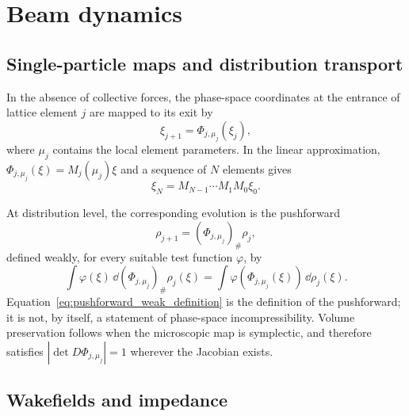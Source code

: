 \section{Beam dynamics}
\label{sec:beam_dynamics_data}

\subsection{Single-particle maps and distribution transport}

In the absence of collective forces, the phase-space coordinates at the entrance of lattice element $j$ are mapped to its exit by
\begin{equation}
    \xi_{j+1}=\Phi_{j,\mu_j}(\xi_j),
    \label{eq:single_particle_map}
\end{equation}
where $\mu_j$ contains the local element parameters. In the linear approximation, $\Phi_{j,\mu_j}(\xi)=M_j(\mu_j)\xi$ and a sequence of $N$ elements gives
\begin{equation}
    \xi_N=M_{N-1}\cdots M_1M_0\xi_0.
    \label{eq:linear_particle_transport}
\end{equation}

At distribution level, the corresponding evolution is the pushforward
\begin{equation}
    \rho_{j+1}=(\Phi_{j,\mu_j})_{\#}\rho_j,
    \label{eq:linear_pushforward}
\end{equation}
defined weakly, for every suitable test function $\varphi$, by
\begin{equation}
    \int \varphi(\xi)\,\dd (\Phi_{j,\mu_j})_{\#}\rho_j(\xi)
    =
    \int \varphi\!\left(\Phi_{j,\mu_j}(\xi)\right)\,\dd\rho_j(\xi).
    \label{eq:pushforward_weak_definition}
\end{equation}
Equation~\eqref{eq:pushforward_weak_definition} is the definition of the pushforward; it is not, by itself, a statement of phase-space incompressibility. Volume preservation follows when the microscopic map is symplectic, and therefore satisfies $|\det D\Phi_{j,\mu_j}|=1$ wherever the Jacobian exists.

\subsection{Wakefields and impedance}

